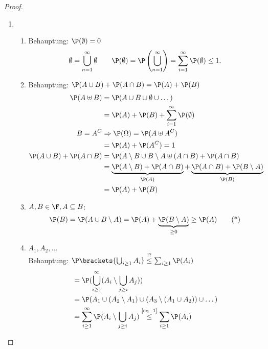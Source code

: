 \begin{proof}
	\begin{enumerate}
		\item 
		\begin{enumerate}
			\item Behauptung: $\P(\emptyset) = 0$
			\begin{align*}
			\emptyset = \bigcup_{n=1}^{\infty} \emptyset\qquad 
			\P(\emptyset) = \P\left(\bigcup_{n=1}^{\infty}\right) = \sum_{i= 1}^{\infty} \P(\emptyset) \le 1.
			\end{align*}
			\item Behauptung: $\P(A \cup B) + \P(A \cap B) = \P(A) + \P(B)$
			\begin{align}
				\P(A\uplus B) 
				&= \P(A \cup B \cup \emptyset \cup \dots)\notag\\ 
				&= \P(A) + \P(B) + \sum_{i=1}^{\infty}\P(\emptyset)\notag\\
				B = A^C &\Rightarrow \P(\Omega) = \P(A \uplus A^C)\notag\\
				&= \P(A) + \P(A^C) = 1\notag\\
				\P(A \cup B) + \P(A \cap B) 
				&= \P(A \setminus B \cup B\setminus A \uplus (A \cap B) + \P(A \cap B)\notag\\
				&= \underbrace{\P(A\setminus B)  + \P(A \cap B)}_{\P(A)} + \underbrace{\P(A \cap B) + \P(B\setminus A)}_{\P(B)}\notag\\
				&= \P(A) + \P(B)\notag
			\end{align}
			\item $A,B \in \F, A \subseteq B$:\\
			\begin{align}
				\P(B) = \P(A \cup B\setminus A) = \P(A) + \underbrace{\P(B\setminus A)}_{\ge 0} \ge \P(A) 
				\label{eq_1}\tag{*}
			\end{align}
			\item $A_1,A_2,\dots$\\
			Behauptung: $\P\brackets{\bigcup_{i \ge 1} A_i} \overset{!?}{\le} \sum_{i\ge 1} \P(A_i)$
			\begin{align}
			&= \P(\bigcup_{i \ge 1}^{\infty}(A_i \setminus \bigcup_{j \ge i} A_j))\notag\\ 
			&= \P(A_1 \cup (A_2 \setminus A_1) \cup (A_3 \setminus (A_1 \cup A_2)) \cup \dots)\notag\\
			&= \sum_{i\ge 1}^{\infty} \P(A_i \setminus \bigcup_{j \ge i} A_j) \overset{\text{\cref{eq_1}}}{\le} \sum_{i\ge 1} \P(A_i)\notag

\end{align}
\end{enumerate}
\end{enumerate}
\end{proof}

